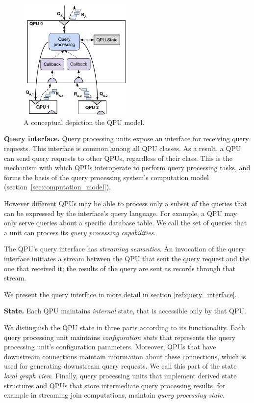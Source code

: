 \begin{figure}[t]
  \centering
    \includegraphics[width=0.5\textwidth]{./figures/design_pattern/qpu_abstraction.pdf}
  \caption{A conceptual depiction the QPU model.}
  \label{fig:qpu_abstraction}
\end{figure}

\medskip
\noindent
\textbf{Query interface.}
Query processing units expose an interface for receiving query requests.
This interface is common among all QPU classes.
As a result, a QPU can send query requests to other QPUs, regardless of their class.
This is the mechanism with which QPUs interoperate to perform query processing tasks,
and forms the basis of the query processing system's computation model (section~\ref{sec:computation_model}).

However different QPUs may be able to process only a subset of the queries that can be expressed by the interface's query
language.
For example, a QPU may only serve queries about a specific database table.
We call the set of queries that a unit can process its \textit{query processing capabilities}.

The QPU's query interface has \textit{streaming semantics}.
An invocation of the query interface initiates a stream between the QPU that sent the query request and the one that
received it;
the results of the query are sent as records through that stream.

We present the query interface in more detail in section \ref{ref:query_interface}.

\medskip
\noindent
\textbf{State.}
Each QPU maintains \textit{internal} state, that is accessible only by that QPU.

We distinguish the QPU state in three parts according to its functionality.
Each query processing unit maintains \textit{configuration state} that represents the query processing unit's
configuration parameters.
Moreover, QPUs that have downstream connections maintain information about these connections, which is
used for generating downstream query requests.
We call this part of the state \textit{local graph view}.
Finally, query processing units that implement derived state structures and QPUs that store intermediate query processing
results, for example in streaming join computations, maintain \textit{query processing state}.

